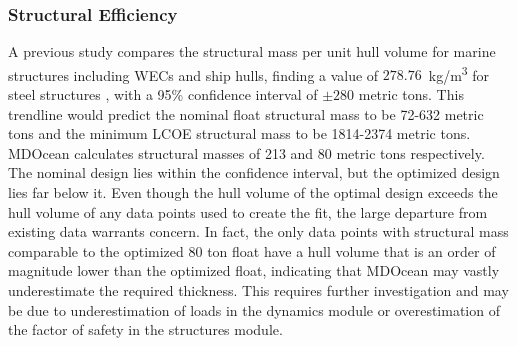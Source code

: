 \subsubsection{Structural Efficiency}
A previous study compares the structural mass per unit hull volume for marine structures including WECs and ship hulls, finding a value of $278.76 $~kg/m\textsuperscript{3} for steel structures \cite{roberts_bringing_2021}, with a 95\% confidence interval of $\pm280$ metric tons. This trendline would predict the nominal float structural mass to be 72-632 metric tons and the minimum LCOE structural mass to be 1814-2374 metric tons. MDOcean calculates structural masses of 213 and 80 metric tons respectively. The nominal design lies within the confidence interval, but the optimized design lies far below it. Even though the hull volume of the optimal design exceeds the hull volume of any data points used to create the fit, the large departure from existing data warrants concern. In fact, the only data points with structural mass comparable to the optimized 80 ton float have a hull volume that is an order of magnitude lower than the optimized float, indicating that MDOcean may vastly underestimate the required thickness. This requires further investigation and may be due to underestimation of loads in the dynamics module or overestimation of the factor of safety in the structures module.


